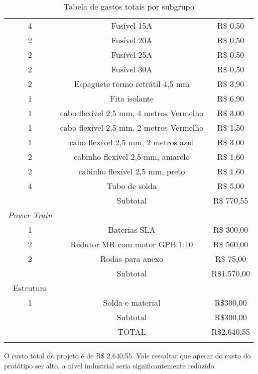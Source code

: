 \begin{longtable}{|c|c|c|}
4 & Fusível 15A & R\$ 0,50 \\
2 & Fusível 20A & R\$ 0,50 \\
2 & Fusível 25A & R\$ 0,50 \\
2 & Fusível 30A & R\$ 0,50 \\
2 & Espaguete termo retrátil 4,5 mm & R\$ 3,90 \\
1 & Fita isolante & R\$ 6,90 \\
1 & cabo flexível 2,5 mm, 4 metros Vermelho & R\$ 3,00 \\
1 & cabo flexível 2,5 mm, 2 metros Vermelho & R\$ 1,50 \\
1 & cabo flexível 2,5 mm, 2 metros azul & R\$ 3,00 \\
2 & cabinho flexível 2,5 mm, amarelo & R\$ 1,60 \\
2 & cabinho flexível 2,5 mm, preto & R\$ 1,60 \\
4 & Tubo de solda & R\$ 5,00 \\
 & Subtotal & R\$ 770,55 \\ \hline
\textit{Power Train} &  &  \\
1 & Baterias SLA & R\$ 300,00 \\
2 & Redutor MR com motor GPB 1:10 & R\$ 560,00 \\
2 & Rodas para anexo & R\$ 75,00 \\
 & Subtotal & R\$1.570,00 \\ \hline
Estrutura &  &  \\
1 & Solda e material & R\$300,00 \\
 & Subtotal & R\$300,00 \\ \hline
 & TOTAL & R\$2.640,55 \\ \hline
\caption{Tabela de gastos totais por subgrupo}
\label{tab:custos_tabela}
\end{longtable}

O custo total do projeto é de R\$ 2.640,55.  Vale ressaltar que apesar do custo do protótipo ser alto, a nível industrial seria significantemente reduzido.
